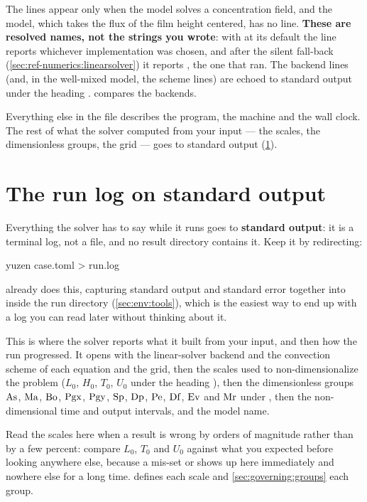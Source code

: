 The  lines appear only when the model solves a concentration
field, and the  model, which takes the flux of the film height
centered, has no  line. \textbf{These are resolved names, not the strings you wrote}: with
 at its default  the line reports whichever
implementation was chosen, and after the silent  fall-back
(\cref{sec:ref-numerics:linearsolver}) it reports , the one that
ran. The backend lines (and, in the well-mixed model, the scheme lines) are
echoed to standard output under the heading
.  compares the
backends.

Everything else in the file describes the program, the machine and the wall
clock. The rest of what the solver computed from your input --- the scales, the
dimensionless groups, the grid --- goes to standard output
(\cref{sec:output:running}).

\section{The run log on standard output}
\label{sec:output:running}

Everything the solver has to say while it runs goes to \textbf{standard
output}: it is a terminal log, not a file, and no result directory contains it.
Keep it by redirecting:

\begin{shell}
yuzen case.toml > run.log
\end{shell}

 already does this, capturing standard output and
standard error together into  inside the run directory
(\cref{sec:env:tools}), which is the easiest way to end up with a log you can
read later without thinking about it.

This is where the solver reports what it built from your input, and then how
the run progressed. It opens with the linear-solver backend and the convection
scheme of each equation and the grid, then the scales
used to non-dimensionalize the problem ($L_0$, $H_0$, $T_0$, $U_0$ under the
heading ), then the dimensionless groups $\mathrm{As}$, $\mathrm{Ma}$,
$\mathrm{Bo}$, $\mathrm{Pgx}$, $\mathrm{Pgy}$, $\mathrm{Sp}$, $\mathrm{Dp}$, $\mathrm{Pe}$, $\mathrm{Df}$, $\mathrm{Ev}$ and $\mathrm{Mr}$ under
, then the non-dimensional time and output
intervals, and the model name.

Read the scales here when a result is wrong by orders of magnitude rather than
by a few percent: compare $L_0$, $T_0$ and $U_0$ against what you expected
before looking anywhere else, because a mis-set
 or
 shows up here immediately and
nowhere else for a long time.  defines each scale
and \cref{sec:governing:groups} each group.

